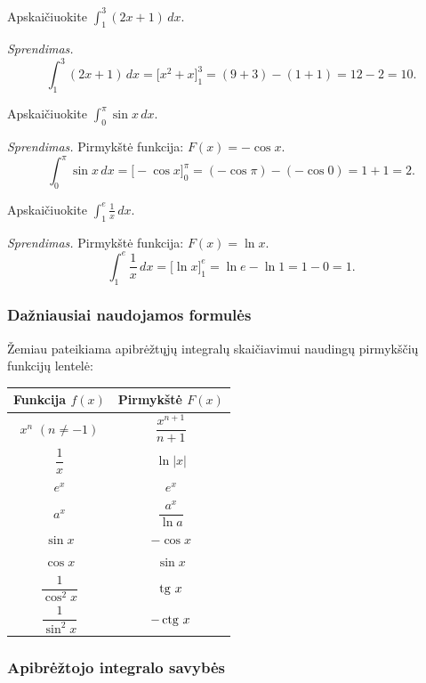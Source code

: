 \begin{example}
Apskaičiuokite $\displaystyle\int_1^3 (2x + 1)\,dx$.

\textit{Sprendimas.}
\[
\int_1^3 (2x+1)\,dx = \Big[x^2 + x\Big]_1^3 = (9 + 3) - (1 + 1) = 12 - 2 = 10.
\]
\end{example}

\begin{example}
Apskaičiuokite $\displaystyle\int_0^{\pi} \sin x\,dx$.

\textit{Sprendimas.} Pirmykštė funkcija: $F(x) = -\cos x$.
\[
\int_0^{\pi} \sin x\,dx = \Big[-\cos x\Big]_0^{\pi} = (-\cos\pi) - (-\cos 0) = 1 + 1 = 2.
\]
\end{example}

\begin{example}
Apskaičiuokite $\displaystyle\int_1^{e} \frac{1}{x}\,dx$.

\textit{Sprendimas.} Pirmykštė funkcija: $F(x) = \ln x$.
\[
\int_1^{e} \frac{1}{x}\,dx = \Big[\ln x\Big]_1^{e} = \ln e - \ln 1 = 1 - 0 = 1.
\]
\end{example}

\subsubsection{Dažniausiai naudojamos formulės}

Žemiau pateikiama apibrėžtųjų integralų skaičiavimui naudingų pirmykščių funkcijų lentelė:

\renewcommand{\arraystretch}{1.8}
\begin{center}
\begin{tabular}{|c|c|}
\hline
\textbf{Funkcija} $f(x)$ & \textbf{Pirmykštė} $F(x)$ \\
\hline
$x^n$ $(n \neq -1)$ & $\dfrac{x^{n+1}}{n+1}$ \\
\hline
$\dfrac{1}{x}$ & $\ln|x|$ \\
\hline
$e^x$ & $e^x$ \\
\hline
$a^x$ & $\dfrac{a^x}{\ln a}$ \\
\hline
$\sin x$ & $-\cos x$ \\
\hline
$\cos x$ & $\sin x$ \\
\hline
$\dfrac{1}{\cos^2 x}$ & $\operatorname{tg}\, x$ \\
\hline
$\dfrac{1}{\sin^2 x}$ & $-\operatorname{ctg}\, x$ \\
\hline
\end{tabular}
\end{center}

\subsubsection{Apibrėžtojo integralo savybės}

